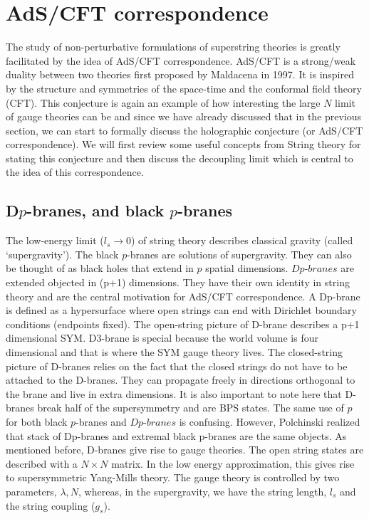\section{AdS/CFT correspondence} 
The study of non-perturbative formulations of superstring theories is greatly facilitated by the idea of AdS/CFT correspondence. AdS/CFT is 
a strong/weak duality between two theories first proposed by Maldacena in 1997. 
It is inspired by the structure and symmetries of the space-time and the conformal field theory (CFT). 
This conjecture is again an example of how interesting the large $N$ limit of gauge theories can be and since we have already discussed 
that in the previous section, we can start to formally discuss the holographic conjecture (or AdS/CFT correspondence). We will first review 
some useful concepts from String theory for stating this conjecture and then discuss the decoupling limit which is central to the idea of this 
correspondence. 





\subsection{D$p$-branes, and black $p$-branes} 

The low-energy limit ($l_{s} \to 0$) of string theory describes classical gravity (called `supergravity'). 
The black $p$-branes are solutions of supergravity. They can also be thought of as black holes that extend in $p$ spatial dimensions. 
$\textit{Dp-branes}$ are extended objected in (p+1) dimensions. 
They have their own identity in string theory and are the central motivation for AdS/CFT correspondence. 
A Dp-brane is defined as a hypersurface where open strings can end with Dirichlet boundary conditions (endpoints fixed). 
The open-string picture of D-brane describes a p+1 dimensional SYM. D3-brane is special because the world volume is four dimensional 
and that is where the SYM gauge theory lives. The closed-string picture of D-branes relies on the fact that the closed strings do not have to 
be attached to the D-branes. They can propagate freely in directions orthogonal to the brane and live in extra dimensions. 
It is also important to note here that D-branes break half of the supersymmetry and are BPS states. 
The same use of $p$ for both black $p$-branes and $\textit{Dp-branes}$ is confusing. 
However, Polchinski \cite{Polchinski:1995mt} realized that stack of Dp-branes and extremal black p-branes are the same objects.
As mentioned before, D-branes give rise to gauge theories. The open string states are described with a $N \times N$ matrix. 
In the low energy approximation, this gives rise to supersymmetric Yang-Mills theory. The gauge theory is controlled by two parameters, 
$\lambda, N$, whereas, in the supergravity, we have the string length, $l_{s}$ and the string coupling ($g_{s}$). 

